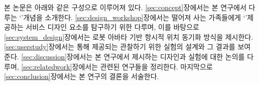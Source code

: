 
본 논문은 아래와 같은 구성으로 이루어져 있다. \ref{sec:concept}장에서는 본 연구에서 다루는 `\concept' 개념을 소개한다. \ref{sec:design_workshop}장에서는 떨어져 사는 가족들에게 `\concept'\을 제공하는 서비스 디자인 요소를 탐구하기 위한 \expWorkshop\을 다루며, 이를 바탕으로 \ref{sec:system_design}장에서는 로봇 아바타 기반 항시적 위치 동기화 방식을 제시한다. \ref{sec:userstudy}장에서는 \sysname\를 통해 제공되는 \concept\을 관찰하기 위한 실험의 설계와 그 결과를 보여준다. \ref{sec:discussion}장에서는 본 연구에서 제시하는 디자인과 실험에 대한 논의를 다루며, \ref{sec:relatedwork}장에서는 관련된 연구들을 정리한다. 마지막으로 \ref{sec:conclusion}장에서는 본 연구의 결론을 서술한다.









